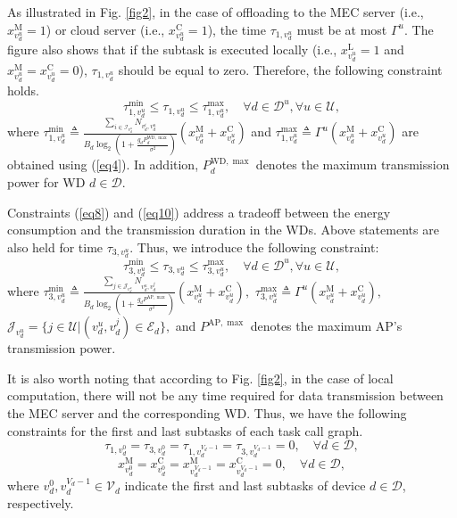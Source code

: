 \documentclass[12pt,draftclsnofoot,onecolumn]{IEEEtran}
\begin{document}
As illustrated in Fig. \ref{fig2}, in the case of offloading to the MEC server (i.e., $x^{\text{M}}_{v_d^u}=1$) or cloud server (i.e., $x^{\text{C}}_{v_d^u}=1$), the time $\tau_{1,v_d^u}$ must be at most $\Gamma^u$. The figure also shows that if the subtask is executed locally (i.e., $x^{\text{L}}_{v_d^u}=1$ and $x^{\text{M}}_{v_d^u}=x^{\text{C}}_{v_d^u}=0$), $\tau_{1,v_d^u}$ should be equal to zero. Therefore, the following constraint holds.
\begin{equation}\label{eq10}
	\tau^{\min}_{1,v_d^u}\leq\tau_{1,v_d^u}\leq \tau^{\max}_{1,v_d^u},\quad\forall d\in\mathcal{D}^u, \forall u\in\mathcal{U},
\end{equation}
where $\tau^{\min}_{1,v_d^u}\triangleq\frac{\sum_{i\in\mathcal{I}_{v_d^u}}N_{v_d^i,v_d^u}}{B_d\log_2\left( 1+\frac{g_dP^{\text{WD}, \max}_d}{\sigma^2}\right)}\left(x^{\text{M}}_{v_d^u} + x^{\text{C}}_{v_d^u}\right)$ and  $\tau^{\max}_{1,v_d^u}\triangleq\Gamma^u\left(x^{\text{M}}_{v_d^u} + x^{\text{C}}_{v_d^u}\right)$ are obtained using (\ref{eq4}). In addition, $P^{\text{WD}, \max}_d$ denotes the maximum transmission power for WD $d\in\mathcal{D}$.

Constraints (\ref{eq8}) and (\ref{eq10}) address a tradeoff between the energy consumption and the transmission duration in the WDs. Above statements are also held for time $\tau_{3,v_d^u}$. Thus, we introduce the following constraint:
\begin{equation}\label{eq11}
	\tau^{\min}_{3,v_d^u} \leq \tau_{3,v_d^u} \leq \tau^{\max}_{3,v_d^u},\quad\forall d\in\mathcal{D}^u, \forall u\in\mathcal{U},
\end{equation}
where
$\tau^{\min}_{3,v_d^u}\triangleq\frac{\sum_{j\in\mathcal{J}_{v_d^u}}N_{v_d^u,v_d^j}}{B_d\log_2\left( 1+\frac{g_dP^{\text{AP}, \max}}{\sigma^2}\right)}\left(x^{\text{M}}_{v_d^u} + x^{\text{C}}_{v_d^u}\right), $ $\tau^{\max}_{3,v_d^u}\triangleq\Gamma^u\left(x^{\text{M}}_{v_d^u} + x^{\text{C}}_{v_d^u}\right),$  $\mathcal{J}_{v_d^u}=\{j\in\mathcal{U}|(v_d^u,v_d^j)\in\mathcal{E}_d\},$ and $P^{\text{AP}, \max}$ denotes the maximum AP's transmission power.

It is also worth noting that according to Fig. \ref{fig2}, in the case of local computation, there will not be any time required for data transmission between the MEC server and the corresponding WD. Thus, we have the following constraints for the first and last subtasks of each task call graph.
\begin{equation}\label{eq12_1}
	\tau_{1,v_d^0} = \tau_{3,v_d^0} = \tau_{1,v_d^{V_d-1}} = \tau_{3,v_d^{V_d-1}} = 0,\quad\forall d\in\mathcal{D},
\end{equation}
\begin{equation}\label{eq12_2}
	x^{\text{M}}_{v_d^0} = x^{\text{C}}_{v_d^0} = x^{\text{M}}_{v_d^{V_d-1}} = x^{\text{C}}_{v_d^{V_d-1}} = 0,\quad\forall d\in\mathcal{D},
\end{equation}
where $v_d^0,v_d^{V_d-1}\in\mathcal{V}_d$ indicate the first and last subtasks of device $d\in\mathcal{D}$, respectively.
\end{document}

